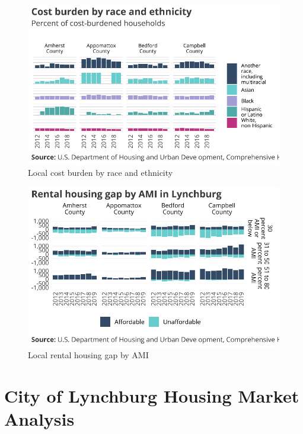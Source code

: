 \documentclass[
  letterpaper,
  DIV=11,
  numbers=noendperiod]{scrreprt}
\begin{document}
\begin{figure}[H]

{\centering \includegraphics{./part-3-2_files/figure-pdf/fig-cb-race-1.pdf}

}

\caption{\label{fig-cb-race}Local cost burden by race and ethnicity}

\end{figure}

\begin{figure}[H]

{\centering \includegraphics{./part-3-2_files/figure-pdf/fig-gap-1.pdf}

}

\caption{\label{fig-gap}Local rental housing gap by AMI}

\end{figure}

\hypertarget{city-of-lynchburg-housing-market-analysis}{%
\chapter{City of Lynchburg Housing Market
Analysis}\label{city-of-lynchburg-housing-market-analysis}}
\end{document}
